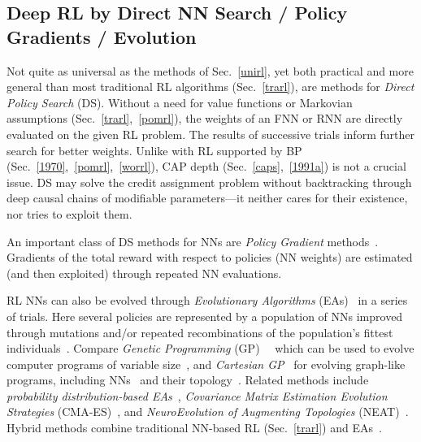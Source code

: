 \documentclass[letterpaper]{article}
\begin{document}
\begin{CJK*}{UTF8}{gbsn}
\begin{sloppypar}
\subsection{Deep RL by Direct NN Search / Policy Gradients / Evolution}
\label{evorl}

Not quite as universal as the methods of Sec.~\ref{unirl},
yet both practical and more general than most traditional RL algorithms (Sec.~\ref{trarl}), are 
methods for {\em Direct Policy Search} (DS).
Without a need for value functions or Markovian assumptions (Sec.~\ref{trarl},~\ref{pomrl}), 
the weights of an FNN or RNN are directly evaluated on the given RL problem.
The results of successive trials inform further search for better weights.
Unlike with RL supported by BP (Sec.~\ref{1970},~\ref{pomrl},~\ref{worrl}),
CAP depth (Sec.~\ref{caps},~\ref{1991a}) is not a crucial issue.
DS may solve the credit assignment problem without 
backtracking through deep causal chains of 
modifiable parameters---it neither cares for their existence,
nor tries to exploit them.


An important class of DS methods for NNs are 
{\em Policy Gradient}
methods~\citep{Williams:86,Williams:88,Williams:92,Sutton:99,baxter2001,aberdeenthesis,ghavamzadehICML03,stoneICRA04,wierstraCEC08,rueckstiess2008b,peters2008neuralnetworks,peters2008neurocomputing,sehnke2009parameter,gruettner2010multi,wierstra2010,peters2010,grondman2012,heess2012}.
Gradients of the total reward with respect to policies (NN weights) are 
estimated (and then exploited) through repeated NN evaluations.

RL NNs can also be evolved through
{\em Evolutionary Algorithms} (EAs)~\citep{Rechenberg:71,Schwefel:74,Holland:75,Fogel:66,goldberg:gabook89}
 in a series of trials.
Here several policies are represented by a population
of NNs improved through mutations and/or
repeated recombinations of the population's fittest individuals~\citep[e.g.,][]{montana1989,fogel1990,maniezzo1994,happel1994,nolfi1994}.
Compare {\em Genetic Programming} (GP)~\citep{Cramer:85}~\citep[see also][]{smith80} which
can be used to evolve computer programs of variable size~\citep{gp87,Koza:92},
and {\em Cartesian GP}~\citep{miller2000,miller2009} 
for evolving graph-like programs,
including NNs~\citep{khan2010} and their topology~\citep{turner2013}.
Related methods include 
{\em probability distribution-based EAs}~\citep{Baluja:94,saravanan:ieeeexpert95,Salustowicz:97ecj,Larraanaga2001}, 
{\em Covariance Matrix Estimation Evolution Strategies} (CMA-ES)~\citep{hansenCMA,hansen2003,igel:cec03,heidrich-meisner:09},
and {\em NeuroEvolution of Augmenting Topologies} (NEAT)~\citep{stanley:ec02}.
Hybrid methods combine traditional NN-based RL (Sec.~\ref{trarl}) and EAs~\citep[e.g.,][]{whiteson2006}.



\end{sloppypar}
\end{CJK*}
\end{document}
